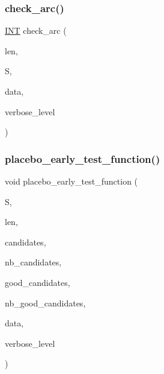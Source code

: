 \mbox{\label{arc__generator_8_c_ae2a65ef645b4b5b21499c247a4e19913}} 
\subsubsection{\texorpdfstring{check\+\_\+arc()}{check\_arc()}}
{\footnotesize\ttfamily \mbox{\hyperlink{galois_8h_a09fddde158a3a20bd2dcadb609de11dc}{I\+NT}} check\+\_\+arc (\begin{DoxyParamCaption}\item[{\mbox{\hyperlink{galois_8h_a09fddde158a3a20bd2dcadb609de11dc}{I\+NT}}}]{len,  }\item[{\mbox{\hyperlink{galois_8h_a09fddde158a3a20bd2dcadb609de11dc}{I\+NT}} $\ast$}]{S,  }\item[{void $\ast$}]{data,  }\item[{\mbox{\hyperlink{galois_8h_a09fddde158a3a20bd2dcadb609de11dc}{I\+NT}}}]{verbose\+\_\+level }\end{DoxyParamCaption})}

\mbox{\label{arc__generator_8_c_ac01c5340fce2599c4ca7b7eaaa25243b}} 
\subsubsection{\texorpdfstring{placebo\+\_\+early\+\_\+test\+\_\+function()}{placebo\_early\_test\_function()}}
{\footnotesize\ttfamily void placebo\+\_\+early\+\_\+test\+\_\+function (\begin{DoxyParamCaption}\item[{\mbox{\hyperlink{galois_8h_a09fddde158a3a20bd2dcadb609de11dc}{I\+NT}} $\ast$}]{S,  }\item[{\mbox{\hyperlink{galois_8h_a09fddde158a3a20bd2dcadb609de11dc}{I\+NT}}}]{len,  }\item[{\mbox{\hyperlink{galois_8h_a09fddde158a3a20bd2dcadb609de11dc}{I\+NT}} $\ast$}]{candidates,  }\item[{\mbox{\hyperlink{galois_8h_a09fddde158a3a20bd2dcadb609de11dc}{I\+NT}}}]{nb\+\_\+candidates,  }\item[{\mbox{\hyperlink{galois_8h_a09fddde158a3a20bd2dcadb609de11dc}{I\+NT}} $\ast$}]{good\+\_\+candidates,  }\item[{\mbox{\hyperlink{galois_8h_a09fddde158a3a20bd2dcadb609de11dc}{I\+NT}} \&}]{nb\+\_\+good\+\_\+candidates,  }\item[{void $\ast$}]{data,  }\item[{\mbox{\hyperlink{galois_8h_a09fddde158a3a20bd2dcadb609de11dc}{I\+NT}}}]{verbose\+\_\+level }\end{DoxyParamCaption})}


